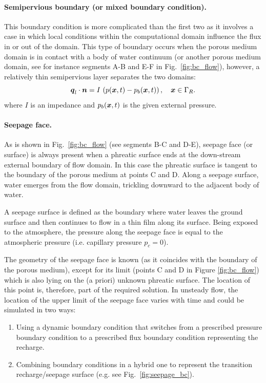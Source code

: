 \paragraph{Semipervious boundary (or mixed boundary condition).}
This boundary condition is more complicated than the first two as it involves a case 
in which local conditions within the computational domain influence the flux in or 
out of the domain.
This type of boundary occurs when the porous medium domain is in contact with 
a body of water continuum (or another porous medium domain, see for instance segments 
A-B and E-F in Fig.~\ref{fig:bc_flow}), however, a relatively thin semipervious layer 
separates the two domains:
\begin{equation}
\label{eq:BC semipervious}
  {\boldsymbol{q}}_l \cdot \boldsymbol{n} = I\, \left(p ({\boldsymbol{x}},t) - p_{b}({\boldsymbol{x}},t) \right), \quad {\boldsymbol{x}} \in \Gamma_R.
\end{equation}
where $I$ is an impedance and $p_{b}({\boldsymbol{x}},t)$ is the given external pressure.

\paragraph{Seepage face.}
As is shown in Fig.~\ref{fig:bc_flow} (see segments B-C and D-E), seepage face (or surface) 
is always present when a phreatic surface ends at the down-stream external boundary of flow domain.
In this case the phreatic surface is tangent to the boundary of the porous medium at points C and D.
Along a seepage surface, water emerges from the flow domain, trickling downward to the adjacent body of water.

A seepage surface is defined as the boundary 
where water leaves the ground surface and then continues to flow in a thin film along its surface.
Being exposed to the atmosphere, the pressure along the seepage face is equal to the atmospheric pressure 
(i.e. capillary pressure $p_{c}=0$). 

The geometry of the seepage face is known (as it coincides with the boundary of the porous medium), 
except for its limit (points C and D in Figure \ref{fig:bc_flow}) 
which is also lying on the (a priori) unknown phreatic surface.
The location of this point is, therefore, part of the required solution.
In unsteady flow, the location of the upper limit of the seepage face varies with time
and could be simulated in two ways:
\begin{enumerate}
\item Using a dynamic boundary condition that switches from a prescribed pressure boundary condition
to a prescribed flux boundary condition representing the recharge.
\item Combining boundary conditions in a hybrid one to represent the transition recharge/seepage 
surface (e.g. see Fig.~\ref{fig:seepage_bc}).
\end{enumerate}

